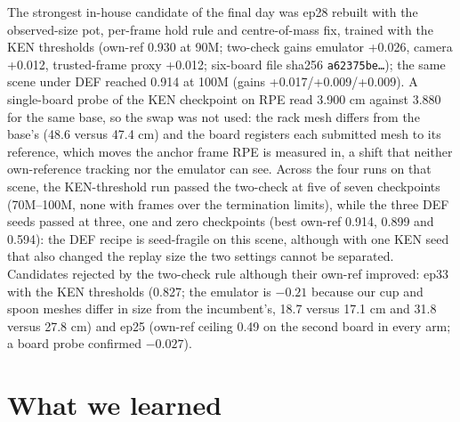 \documentclass[10pt,a4paper]{article}
\newcommand{\code}[1]{\texttt{#1}}
\begin{document}
\begin{table}[h]\centering\footnotesize
\caption{Per-episode composition of the final file. ``base'' = team base bob1; ``swap Tn'' = hand-fix line single-episode submission merged at row level. Own-ref is tracking AUC against the scene's own reference. Checkpoint and rows are sha256 prefixes of the policy file and of the submitted rows.}
\label{tab:episodes}
\resizebox{\textwidth}{!}{}
\end{table}

The strongest in-house candidate of the final day was ep28 rebuilt with the observed-size pot, per-frame hold rule and centre-of-mass fix, trained with the KEN thresholds (own-ref 0.930 at 90M; two-check gains emulator +0.026, camera +0.012, trusted-frame proxy +0.012; six-board file sha256 \code{a62375be\ldots}); the same scene under DEF reached 0.914 at 100M (gains +0.017/+0.009/+0.009). A single-board probe of the KEN checkpoint on RPE read 3.900 cm against 3.880 for the same base, so the swap was not used: the rack mesh differs from the base's (48.6 versus 47.4 cm) and the board registers each submitted mesh to its reference, which moves the anchor frame RPE is measured in, a shift that neither own-reference tracking nor the emulator can see. Across the four runs on that scene, the KEN-threshold run passed the two-check at five of seven checkpoints (70M--100M, none with frames over the termination limits), while the three DEF seeds passed at three, one and zero checkpoints (best own-ref 0.914, 0.899 and 0.594): the DEF recipe is seed-fragile on this scene, although with one KEN seed that also changed the replay size the two settings cannot be separated. Candidates rejected by the two-check rule although their own-ref improved: ep33 with the KEN thresholds (0.827; the emulator is $-0.21$ because our cup and spoon meshes differ in size from the incumbent's, 18.7 versus 17.1 cm and 31.8 versus 27.8 cm) and ep25 (own-ref ceiling 0.49 on the second board in every arm; a board probe confirmed $-0.027$).

\section{What we learned}
\label{sec:lessons}
\end{document}
